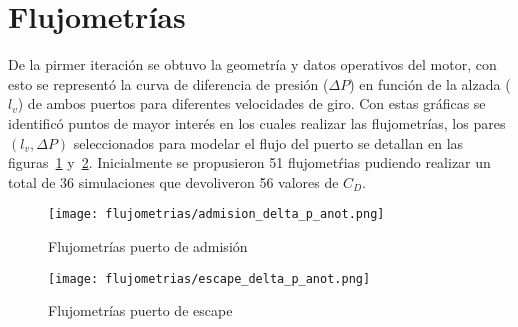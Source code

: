 \section{Flujometrías}

De la pirmer iteración se obtuvo la geometría y datos operativos del motor, con
esto se representó la curva de diferencia de presión ($\Delta P$) en función de
la alzada ($l_{v}$) de ambos puertos para diferentes velocidades de giro.
%
Con estas gráficas se identificó puntos de mayor interés en los cuales realizar
las flujometrías, los pares $(l_{v}, \Delta P)$ seleccionados para modelar el
flujo del puerto se detallan en las figuras~\ref{fig:delta_p_admision}
y~\ref{fig:delta_p_escape}.
%
Inicialmente se propusieron 51 flujometŕias pudiendo realizar un total de 36
simulaciones que devoliveron 56 valores de $C_{D}$.

\begin{figure}[h]
  \centering
  \texttt{[image: flujometrias/admision\_delta\_p\_anot.png]}
  \caption{Flujometrías puerto de admisión}\label{fig:delta_p_admision}
\end{figure}

\begin{figure}[h]
  \centering
  \texttt{[image: flujometrias/escape\_delta\_p\_anot.png]}
  \caption{Flujometrías puerto de escape}\label{fig:delta_p_escape}
\end{figure}




